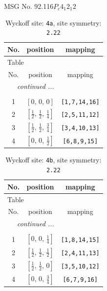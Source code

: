 \documentclass[fleqn,8pt]{jsarticle}
\begin{document}
\setcounter{MaxMatrixCols}{32}

\renewcommand{\tablename}{Table~}
\renewcommand{\figurename}{Figure~}
\begin{center}
\LARGE
MSG No. 92.116\quad$P_{c}4_{1}2_{1}2$
\end{center}
\renewcommand{\arraystretch}{1.2}
\begin{longtable}{ccc}
\caption{Wyckoff site: {\tt 4a}, site symmetry: {\tt 2.22}}
 \\
 \hline \hline
No. & position & mapping \\ \hline \endfirsthead

\multicolumn{2}{l}{\tablename\ \thetable{}} \\
 \hline \hline
No. & position & mapping \\ \hline \endhead

 \hline \hline
\multicolumn{2}{r}{\footnotesize\it continued ...} \\ \endfoot

 \hline \hline
\multicolumn{2}{r}{} \\ \endlastfoot

1 & $\left[ 0,\, 0,\, 0 \right]$ & {\tt [1,7,14,16]} \\ \hline
2 & $\left[ \frac{1}{2},\, \frac{1}{2},\, \frac{1}{4} \right]$ & {\tt [2,5,11,12]} \\ \hline
3 & $\left[ \frac{1}{2},\, \frac{1}{2},\, \frac{3}{4} \right]$ & {\tt [3,4,10,13]} \\ \hline
4 & $\left[ 0,\, 0,\, \frac{1}{2} \right]$ & {\tt [6,8,9,15]} \\
\end{longtable}
\renewcommand{\arraystretch}{1.2}
\begin{longtable}{ccc}
\caption{Wyckoff site: {\tt 4b}, site symmetry: {\tt 2.22}}
 \\
 \hline \hline
No. & position & mapping \\ \hline \endfirsthead

\multicolumn{2}{l}{\tablename\ \thetable{}} \\
 \hline \hline
No. & position & mapping \\ \hline \endhead

 \hline \hline
\multicolumn{2}{r}{\footnotesize\it continued ...} \\ \endfoot

 \hline \hline
\multicolumn{2}{r}{} \\ \endlastfoot

1 & $\left[ 0,\, 0,\, \frac{1}{4} \right]$ & {\tt [1,8,14,15]} \\ \hline
2 & $\left[ \frac{1}{2},\, \frac{1}{2},\, \frac{1}{2} \right]$ & {\tt [2,4,11,13]} \\ \hline
3 & $\left[ \frac{1}{2},\, \frac{1}{2},\, 0 \right]$ & {\tt [3,5,10,12]} \\ \hline
4 & $\left[ 0,\, 0,\, \frac{3}{4} \right]$ & {\tt [6,7,9,16]} \\
\end{longtable}
\end{document}

